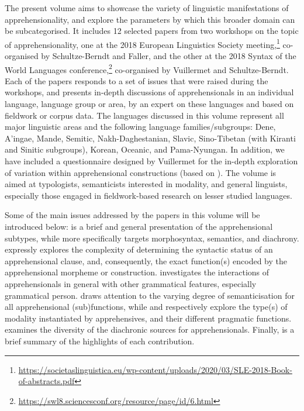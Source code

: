 \documentclass[output=paper,colorlinks,citecolor=brown
]{langscibook}
\begin{document}
The present volume aims to showcase the variety of linguistic manifestations of apprehensionality, and explore the parameters by which this broader domain can be subcategorised. It includes 12 selected papers from two workshops on the topic of apprehensionality, one at the 2018 European Linguistics Society meeting,\footnote{\url{https://societaslinguistica.eu/wp-content/uploads/2020/03/SLE-2018-Book-of-abstracts.pdf}} co-organised by Schultze-Berndt and Faller, and the other at the 2018 Syntax of the World Languages conference,\footnote{\url{https://swl8.sciencesconf.org/resource/page/id/6.html}} co-organised by Vuillermet and Schultze-Berndt. Each of the papers responds to a set of issues that were raised during the workshops, and presents in-depth discussions of apprehensionals in an individual language, language group or area, by an expert on these languages and based on fieldwork or corpus data. The languages discussed in this volume represent all major linguistic areas and the following language families/subgroups: Dene, A'ingae, Mande, Semitic, Nakh-Daghestanian, Slavic, Sino-Tibetan (with Kiranti and Sinitic subgroups), Korean, Oceanic, and Pama-Nyungan. In addition, we have included a questionnaire designed by Vuillermet for the in-depth exploration of variation within apprehensional constructions (based on \cite{VuillermetM2018questionnaire}). The volume is aimed at typologists, semanticists interested in modality, and general linguists, especially those engaged in fieldwork-based research on lesser studied languages.

Some of the main issues addressed by the papers in this volume will be introduced below:  is a brief and general presentation of the apprehensional subtypes, while  more specifically targets morphosyntax,  semantics, and  diachrony.  expressly explores the complexity of determining the syntactic status of an apprehensional clause, and, consequently, the exact function(s) encoded by the apprehensional morpheme or construction.  investigates the interactions of apprehensionals in general with other grammatical features, especially grammatical person.  draws attention to the varying degree of semanticisation for all apprehensional (sub)functions, while  and  respectively explore the type(s) of modality instantiated by apprehensives, and their different pragmatic functions.  examines the diversity of the diachronic sources for apprehensionals. Finally,  is a brief summary of the highlights of each contribution.
\end{document}
